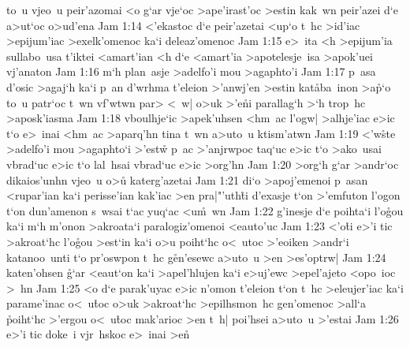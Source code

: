 to~u
vjeo~u
peir'azomai
<o
g`ar
vje`oc
>ape'irast'oc
>estin
kak~wn
peir'azei
d`e
a>ut`oc
o>ud'ena\bibvsend
\vs Jam 1:14
<'ekastoc
d`e
peir'azetai
<up`o
t~hc
>id'iac
>epijum'iac
>exelk'omenoc
ka`i
deleaz'omenoc\bibvsend
\vs Jam 1:15
e>~ita
<h
>epijum'ia
sullabo~usa
t'iktei
<amart'ian
<h
d`e
<amart'ia
>apotelesje~isa
>apok'uei
vj'anaton\bibvsend
\vs Jam 1:16
m`h
plan~asje
>adelfo'i
mou
>agaphto'i\bibvsend
\vs Jam 1:17
p~asa
d'osic
>agaj`h
ka`i
p~an
d'wrhma
t'eleion
>'anwj'en
>estin
kat\r{a}ba~inon
>a\r{p}`o
to~u
patr`oc
t~wn
vf'wtwn
par>
<~w|
o>uk
>'e\r{n}i
parallag`h
>`h
trop~hc
>aposk'iasma\bibvsend
\vs Jam 1:18
vboulhje`ic
>apek'uhsen
<hm~ac
l'ogw|
>alhje'iac
e>ic
t`o
e>~inai
<hm~ac
>aparq'hn
tina
t~wn
a>uto~u
ktism'atwn\bibvsend
\vs Jam 1:19
<'w\r{s}te
>adelfo'i
mou
>agaphto`i
>'est\r{w}
p~ac
>'anjrwpoc
taq`uc
e>ic
t`o
>ako~usai
vbrad`uc
e>ic
t`o
lal~hsai
vbrad`uc
e>ic
>org'hn\bibvsend
\vs Jam 1:20
>org`h
g`ar
>andr`oc
dikaios'unhn
vjeo~u
o>u\r{}
katerg'azetai\bibvsend
\vs Jam 1:21
di`o
>apoj'emenoi
p~asan
<rupar'ian
ka`i
perisse'ian
kak'iac
>en
pra|"'uth\r{t}i
d'exasje
t`on
>'emfuton
l'ogon
t`on
dun'amenon
s~wsai
t`ac
yuq`ac
<u\r{m}~wn\bibvsend
{}
\vs Jam 1:22
g'inesje
d`e
poihta`i
l'o\r{g}ou
ka`i
m`h
m'onon
>akroata`i
paralogiz'omenoi
<eauto'uc\bibvsend
\vs Jam 1:23
<'o\r{t}i
e>'i
tic
>akroat`hc
l'o\r{g}ou
>est`in
ka`i
o>u
poiht`hc
o<~utoc
>'eoiken
>andr`i
katanoo~unti
t`o
pr'oswpon
t~hc
g\r{e}n'esewc
a>uto~u
>en
>es'optrw|\bibvsend
\vs Jam 1:24
katen'ohsen
\r{g}`ar
<eaut`on
ka`i
>apel'hlujen
ka`i
e>uj'ewc
>epel'ajeto
<opo~ioc
>~hn\bibvsend
\vs Jam 1:25
<o
d`e
parak'uyac
e>ic
n'omon
t'eleion
t`on
t~hc
>eleujer'iac
ka`i
parame'inac
o<~u\r{t}oc
o>uk
>akroat`hc
>epilhsmon~hc
gen'omenoc
>all`a
\r{p}oiht`hc
>'ergou
o<~u\r{t}oc
mak'arioc
>en
t~h|
poi'hsei
a>uto~u
>'estai\bibvsend
\vs Jam 1:26
e>'i
tic
doke~i
vjr~hskoc
e>~inai
>en\r{}

